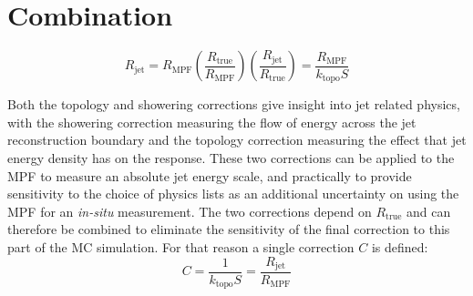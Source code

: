 

\section{Combination}

\begin{equation}
  R_{\mathrm{jet}} = R_{\mathrm{MPF}}\left(\frac{R_{\mathrm{true}}}{R_{\mathrm{MPF}}}\right)\left(\frac{R_{\mathrm{jet}}}{R_{\mathrm{true}}}\right) = \frac{R_{\mathrm{MPF}}}{k_{\mathrm{topo}}S}
\end{equation}

Both the topology and showering corrections give insight into jet related physics, with the showering correction measuring the flow of energy across the jet reconstruction boundary and the topology correction measuring the effect that jet energy density has on the response.  
These two corrections can be applied to the MPF to measure an absolute jet energy scale, and practically to provide sensitivity to the choice of physics lists as an additional uncertainty on using the MPF for an {\textit{in-situ}} measurement.  
The two corrections depend on $R_{\mathrm{true}}$ and can therefore be combined to eliminate the sensitivity of the final correction to this part of the MC simulation.  
For that reason a single correction $C$ is defined:
\begin{equation}
  C = \frac{1}{k_{\mathrm{topo}}S} = \frac{R_{\mathrm{jet}}}{R_{\mathrm{MPF}}}
  \label{EQ:CorrC}
\end{equation}

